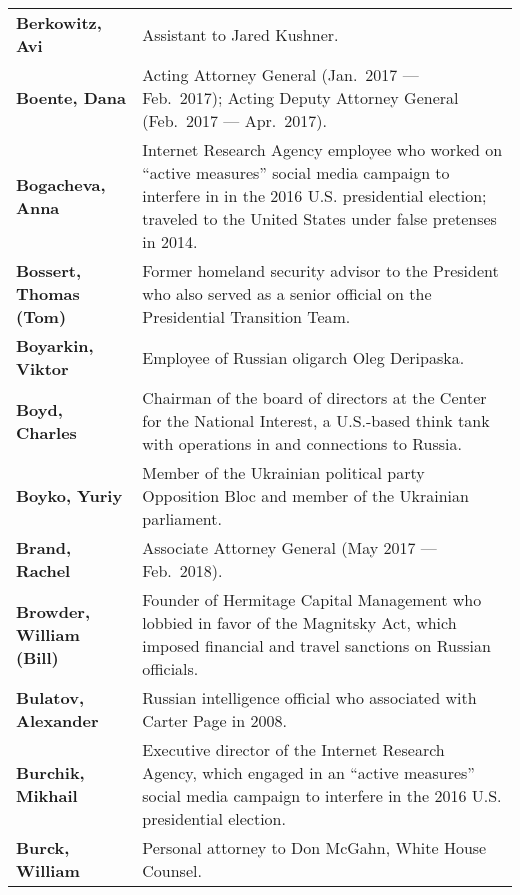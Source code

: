 \begin{longtable}{ p{} p{} }
    \textbf{Berkowitz, Avi} & Assistant to Jared Kushner. \\

    \textbf{Boente, Dana} & Acting Attorney General (Jan.~2017 — Feb.~2017); Acting Deputy Attorney General (Feb.~2017 — Apr.~2017). \\

    \textbf{Bogacheva, Anna} & Internet Research Agency employee who worked on “active measures” social media campaign to interfere in in the 2016 U.S. presidential election; traveled to the United States under false pretenses in 2014. \\

    \textbf{Bossert, Thomas (Tom)} & Former homeland security advisor to the President who also served as a senior official on the Presidential Transition Team. \\

    \textbf{Boyarkin, Viktor} & Employee of Russian oligarch Oleg Deripaska. \\

    \textbf{Boyd, Charles} & Chairman of the board of directors at the Center for the National Interest, a U.S.-based think tank with operations in and connections to Russia. \\

    \textbf{Boyko, Yuriy} & Member of the Ukrainian political party Opposition Bloc and member of the Ukrainian parliament. \\

    \textbf{Brand, Rachel} & Associate Attorney General (May 2017 — Feb.~2018). \\

    \textbf{Browder, William (Bill)} & Founder of Hermitage Capital Management who lobbied in favor of the Magnitsky Act, which imposed financial and travel sanctions on Russian officials. \\

    \textbf{Bulatov, Alexander} & Russian intelligence official who associated with Carter Page in 2008. \\

    \textbf{Burchik, Mikhail} & Executive director of the Internet Research Agency, which engaged in an “active measures” social media campaign to interfere in the 2016 U.S. presidential election. \\

    \textbf{Burck, William} & Personal attorney to Don McGahn, White House Counsel. \\


\end{longtable}
